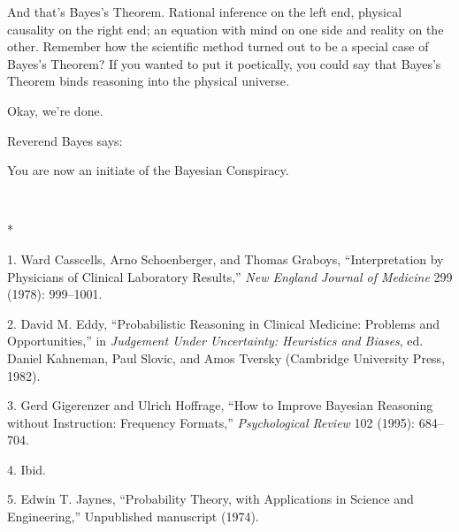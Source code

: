 {
 And that's Bayes's Theorem.
Rational inference on the left end, physical causality on the right
end; an equation with mind on one side and reality on the other.
Remember how the scientific method turned out to be a special case of
Bayes's Theorem? If you wanted to put it poetically,
you could say that Bayes's Theorem binds reasoning into
the physical universe.}

{
 Okay, we're done.}

{\centering
 Reverend Bayes says:\newline
 
 \newline
 You are now an initiate of the Bayesian Conspiracy.
\par}


\bigskip

{\centering
 \ ~
\par}

{\centering
 *
\par}


\bigskip

{
 1. Ward Casscells, Arno Schoenberger, and Thomas Graboys,
``Interpretation by Physicians of Clinical Laboratory
Results,'' \textit{New England Journal of Medicine}
299 (1978): 999--1001.}

{
 2. David M. Eddy, ``Probabilistic Reasoning in
Clinical Medicine: Problems and Opportunities,'' in
\textit{Judgement Under Uncertainty: Heuristics and Biases}, ed. Daniel
Kahneman, Paul Slovic, and Amos Tversky (Cambridge University Press,
1982).}

{
 3. Gerd Gigerenzer and Ulrich Hoffrage, ``How to
Improve Bayesian Reasoning without Instruction: Frequency
Formats,'' \textit{Psychological Review} 102 (1995):
684--704.}

{
 4. Ibid.}

{
 5. Edwin T. Jaynes, ``Probability Theory, with
Applications in Science and Engineering,''
Unpublished manuscript (1974).}


